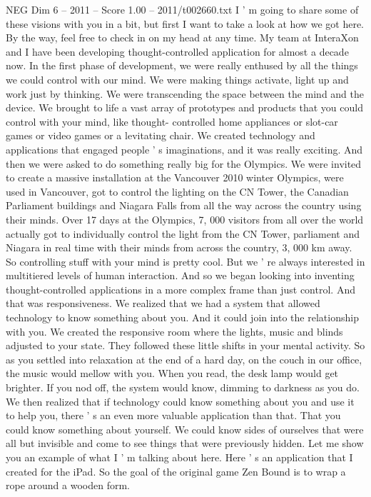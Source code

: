\begin{textsample}{NEG Dim 6 – 2011 – Score 1.00 – 2011/t002660.txt}
I ' m going to share some of these visions with you in a bit, but first I want to take a look at how we got here.
By the way, feel free to check in on my head at any time.
My team at InteraXon and I have been developing thought-controlled application for almost a decade now.
In the first phase of development, we were really enthused by all the things we could control with our mind.
We were making things activate, light up and work just by thinking.
We were transcending the space between the mind and the device.
We brought to life a vast array of prototypes and products that you could control with your mind, like thought- controlled home appliances or slot-car games or video games or a levitating chair.
We created technology and applications that engaged people ' s imaginations, and it was really exciting.
And then we were asked to do something really big for the Olympics.
We were invited to create a massive installation at the Vancouver 2010 winter Olympics, were used in Vancouver, got to control the lighting on the CN Tower, the Canadian Parliament buildings and Niagara Falls from all the way across the country using their minds.
Over 17 days at the Olympics, 7, 000 visitors from all over the world actually got to individually control the light from the CN Tower, parliament and Niagara in real time with their minds from across the country, 3, 000 km away.
So controlling stuff with your mind is pretty cool.
But we ' re always interested in multitiered levels of human interaction.
And so we began looking into inventing thought-controlled applications in a more complex frame than just control.
And that was responsiveness.
We realized that we had a system that allowed technology to know something about you.
And it could join into the relationship with you.
We created the responsive room where the lights, music and blinds adjusted to your state.
They followed these little shifts in your mental activity.
So as you settled into relaxation at the end of a hard day, on the couch in our office, the music would mellow with you.
When you read, the desk lamp would get brighter.
If you nod off, the system would know, dimming to darkness as you do.
We then realized that if technology could know something about you and use it to help you, there ' s an even more valuable application than that.
That you could know something about yourself.
We could know sides of ourselves that were all but invisible and come to see things that were previously hidden.
Let me show you an example of what I ' m talking about here.
Here ' s an application that I created for the iPad.
So the goal of the original game Zen Bound is to wrap a rope around a wooden form.

\end{textsample}
